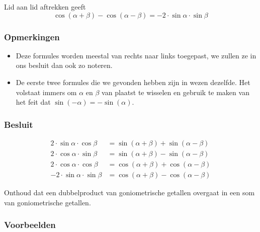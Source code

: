 \documentclass[a4paper,12pt]{article}
\begin{document}
\begin{theorie}
Lid aan lid aftrekken geeft
$$\cos(\alpha+\beta) - \cos(\alpha - \beta) = -2\cdot\sin\alpha\cdot\sin\beta$$


\subsubsection*{Opmerkingen}
\begin{itemize}
  \item Deze formules worden meestal van rechts naar links toegepast, we zullen ze in ons besluit dan ook zo noteren.
  \item De eerste twee formules die we gevonden hebben zijn in wezen dezelfde. Het volstaat immers om $\alpha$ en $\beta$ van plaatst te wisselen en gebruik te maken van het feit dat $\sin(-\alpha)=-\sin(\alpha)$.
\end{itemize}


\subsubsection*{Besluit}
\begin{align*}
  2\cdot \sin\alpha\cdot \cos\beta &= \sin(\alpha+\beta)+\sin(\alpha-\beta)\\
  2\cdot \cos\alpha\cdot \sin\beta &= \sin(\alpha+\beta)-\sin(\alpha-\beta)\\
  2\cdot \cos\alpha\cdot \cos\beta &= \cos(\alpha+\beta)+\cos(\alpha-\beta)\\
  - 2\cdot \sin\alpha\cdot \sin\beta &= \cos(\alpha+\beta)-\cos(\alpha-\beta)
\end{align*}

Onthoud dat een dubbelproduct van goniometrische getallen overgaat in een som van goniometrische getallen.

\subsubsection*{Voorbeelden}


\end{theorie}
\end{document}
